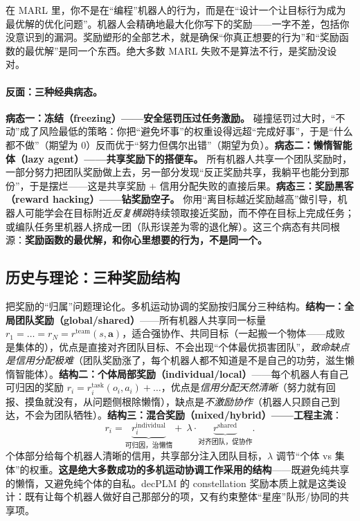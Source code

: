 \begin{insight}
在 MARL 里，你不是在“编程”机器人的行为，而是在“设计一个让目标行为成为最优解的优化问题”。机器人会精确地最大化你写下的奖励——一字不差，包括你没意识到的漏洞。奖励塑形的全部艺术，就是确保“你真正想要的行为”和“奖励函数的最优解”是同一个东西。绝大多数 MARL 失败不是算法不行，是奖励没设对。
\end{insight}

\paragraph{反面：三种经典病态。}
\textbf{病态一：冻结（freezing）——安全惩罚压过任务激励。} 碰撞惩罚过大时，“不动”成了风险最低的策略：你把“避免坏事”的权重设得远超“完成好事”，于是“什么都不做”（期望为 $0$）反而优于“努力但偶尔出错”（期望为负）。\textbf{病态二：懒惰智能体（lazy agent）——共享奖励下的搭便车。} 所有机器人共享一个团队奖励时，一部分努力把团队奖励做上去，另一部分发现“反正奖励共享，我躺平也能分到那份”，于是摆烂——这是共享奖励 $+$ 信用分配失败的直接后果。\textbf{病态三：奖励黑客（reward hacking）——钻奖励空子。} 你用“离目标越近奖励越高”做引导，机器人可能学会在目标附近\emph{反复横跳}持续领取接近奖励，而不停在目标上完成任务；或编队任务里机器人挤成一团（队形误差为零的退化解）。这三个病态有共同根源：\textbf{奖励函数的最优解，和你心里想要的行为，不是同一个。}

\subsection{历史与理论：三种奖励结构}
\label{sec:mc-reward-struct}

把奖励的“归属”问题理论化。多机运动协调的奖励按归属分三种结构。\textbf{结构一：全局团队奖励（global/shared）}——所有机器人共享同一标量 $r_1=\dots=r_N=r^{\text{team}}(s,\mathbf{a})$，适合强协作、共同目标（一起搬一个物体——成败是集体的），优点是直接对齐团队目标、不会出现“个体最优损害团队”，\emph{致命缺点是信用分配极难}（团队奖励涨了，每个机器人都不知道是不是自己的功劳，滋生懒惰智能体）。\textbf{结构二：个体局部奖励（individual/local）}——每个机器人有自己可归因的奖励 $r_i=r_i^{\text{task}}(o_i,a_i)+\dots$，优点是\emph{信用分配天然清晰}（努力就有回报、摸鱼就没有，从问题侧根除懒惰），缺点是\emph{不激励协作}（机器人只顾自己到达，不会为团队牺牲）。\textbf{结构三：混合奖励（mixed/hybrid）——工程主流}：
\begin{equation}
  r_i=\underbrace{r_i^{\text{individual}}}_{\text{可归因，治懒惰}}+\ \lambda\cdot\underbrace{r^{\text{shared}}}_{\text{对齐团队，促协作}}.
  \label{eq:mc-mixed-reward}
\end{equation}
个体部分给每个机器人清晰的信用，共享部分注入团队目标，$\lambda$ 调节“个体 vs 集体”的权重。\textbf{这是绝大多数成功的多机运动协调工作采用的结构}——既避免纯共享的懒惰，又避免纯个体的自私。decPLM 的 constellation 奖励本质上就是这类设计\cite{pandit2025decplm}：既有让每个机器人做好自己那部分的项，又有约束整体“星座”队形/协同的共享项。


